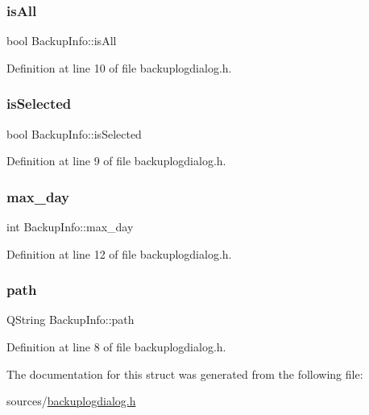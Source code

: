 \mbox{\label{struct_backup_info_a6ab70d40085ca41f65a2b6260b48b0a2}} 
\subsubsection{\texorpdfstring{is\+All}{isAll}}
{\footnotesize\ttfamily bool Backup\+Info\+::is\+All}



Definition at line 10 of file backuplogdialog.\+h.

\mbox{\label{struct_backup_info_a44bd4711889aec5b8863e688b85d926b}} 
\subsubsection{\texorpdfstring{is\+Selected}{isSelected}}
{\footnotesize\ttfamily bool Backup\+Info\+::is\+Selected}



Definition at line 9 of file backuplogdialog.\+h.

\mbox{\label{struct_backup_info_a57ebfab4744a979666451e9c94a24ac7}} 
\subsubsection{\texorpdfstring{max\+\_\+day}{max\_day}}
{\footnotesize\ttfamily int Backup\+Info\+::max\+\_\+day}



Definition at line 12 of file backuplogdialog.\+h.

\mbox{\label{struct_backup_info_a0c821a66542387252d525ef6ca367dc0}} 
\subsubsection{\texorpdfstring{path}{path}}
{\footnotesize\ttfamily Q\+String Backup\+Info\+::path}



Definition at line 8 of file backuplogdialog.\+h.



The documentation for this struct was generated from the following file\+:\begin{DoxyCompactItemize}
\item 
sources/\mbox{\hyperlink{backuplogdialog_8h}{backuplogdialog.\+h}}\end{DoxyCompactItemize}
